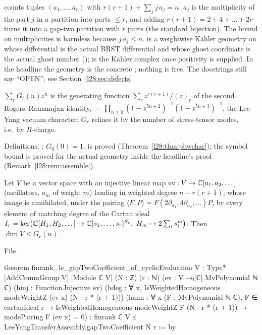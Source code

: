 \begin{dictionary}
 counts tuples $(a_1,\dots,a_r)$ with $r(r+1)+\sum_j j\,a_j=n$: $a_j$ is the multiplicity of the part $j$ in a partition
into parts $\le r$, and adding $r(r+1)=2+4+\dots+2r$ turns it into a gap-two partition with $r$ parts (the standard bijection). The bound
 on multiplicities is harmless because $j\,a_j\le n$.  is a weightwise Kähler geometry on
 whose differential is the actual BRST differential and whose ghost coordinate is the actual ghost number
();  is the Kähler complex once positivity  is supplied. In the headline the
geometry is the concrete ; nothing is free. The docstrings still say ``OPEN''; see Section~\ref{l28:sec:defects}.
\end{dictionary}

\begin{physics}
$\sum_rG_r(n)z^n$ is the generating function $\sum_rz^{r(r+1)}/(z)_r$ of the second Rogers--Ramanujan identity, $=\prod_{n\ge0}(1-z^{5n+2})^{-1}(1-z^{5n+3})^{-1}$,
the Lee--Yang vacuum character; $G_r$ refines it by the number of stress-tensor modes, i.e.\ by $R$-charge.
\end{physics}

\begin{status}
Definitions. : $G_0(0)=1$.  is proved (Theorem~\ref{l28:thm:pbwchar}); the
symbol bound is proved for the actual geometry inside the headline's proof (Remark~\ref{l28:rem:assemble}).
\end{status}

\begin{theorem}\label{l28:thm:cyclic}
Let $V$ be a vector space with an injective linear map $\mathrm{ev}:V\to{\mathbb{C}}[a_1,a_2,\dots]$ (oscillators, $a_m$ of weight $m$) landing in weighted
degree $n-r(r+1)$, whose image is annihilated, under the pairing $\langle F,P\rangle=F(2\partial_{a_1},4\partial_{a_2},\dots)P$, by every element of
matching degree of the Cartan ideal $I_r=\ker\bigl(\C[H_1,H_2,\dots]\to\C[s_1,\dots,s_r]^{S_r},\ H_m\mapsto2\sum_is_i^m\bigr)$. Then
$\dim V\le G_r(n)$.
\end{theorem}

\noindent File .
\begin{leancode}
theorem finrank_le_gapTwoCoefficient_of_cyclicEvaluation
    {V : Type*} [AddCommGroup V] [Module ℂ V] (N : ℤ) (r : ℕ)
    (ev : V →ₗ[ℂ] MvPolynomial ℕ ℂ) (hinj : Function.Injective ev)
    (hdeg : ∀ x, IsWeightedHomogeneous modeWeightZ (ev x) (N - r * (r + 1)))
    (hann : ∀ x (F : MvPolynomial ℕ ℂ), F ∈ cartanIdeal r →
      IsWeightedHomogeneous modeWeightZ F (N - r * (r + 1)) → modePairing F (ev x) = 0) :
    finrank ℂ V ≤ LeeYangTransferAssembly.gapTwoCoefficient N r := by
\end{leancode}

